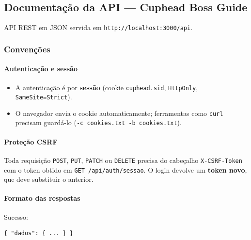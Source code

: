 \hypertarget{documentauxe7uxe3o-da-api--cuphead-boss-guide}{%
\subsection{Documentação da API --- Cuphead Boss
Guide}\label{documentauxe7uxe3o-da-api--cuphead-boss-guide}}

API REST em JSON servida em \texttt{http://localhost:3000/api}.

\hypertarget{convenuxe7uxf5es}{%
\subsubsection{Convenções}\label{convenuxe7uxf5es}}

\hypertarget{autenticauxe7uxe3o-e-sessuxe3o}{%
\paragraph{Autenticação e sessão}\label{autenticauxe7uxe3o-e-sessuxe3o}}

\begin{itemize}
\tightlist
\item
  A autenticação é por \textbf{sessão} (cookie \texttt{cuphead.sid},
  \texttt{HttpOnly}, \texttt{SameSite=Strict}).
\item
  O navegador envia o cookie automaticamente; ferramentas como
  \texttt{curl} precisam guardá-lo
  (\texttt{-c\ cookies.txt\ -b\ cookies.txt}).
\end{itemize}

\hypertarget{proteuxe7uxe3o-csrf}{%
\paragraph{Proteção CSRF}\label{proteuxe7uxe3o-csrf}}

Toda requisição \texttt{POST}, \texttt{PUT}, \texttt{PATCH} ou
\texttt{DELETE} precisa do cabeçalho \texttt{X-CSRF-Token} com o token
obtido em \texttt{GET\ /api/auth/sessao}. O login devolve um
\textbf{token novo}, que deve substituir o anterior.

\hypertarget{formato-das-respostas}{%
\paragraph{Formato das respostas}\label{formato-das-respostas}}

Sucesso:

\begin{Verbatim}[breaklines,breakanywhere,fontsize=\scriptsize]
{ "dados": { ... } }
\end{Verbatim}

